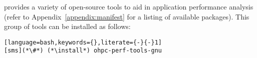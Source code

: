 \OHPC{} provides a variety of open-source tools to aid in application 
performance analysis (refer to Appendix~\ref{appendix:manifest} for a listing
of available packages). This group of tools can be installed as follows:

\begin{lstlisting}[language=bash,keywords={},literate={-}{-}1]
[sms](*\#*) (*\install*) ohpc-perf-tools-gnu
\end{lstlisting}


